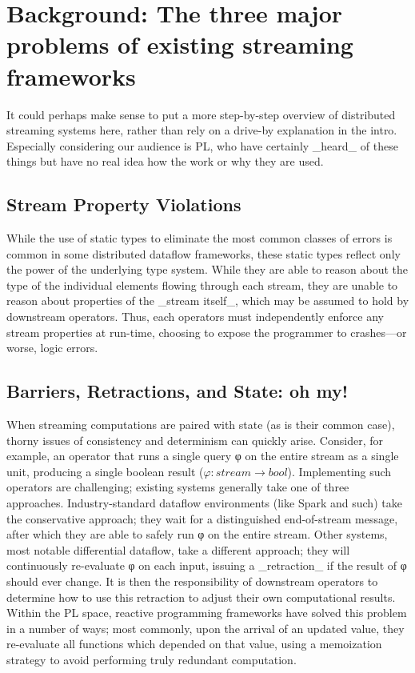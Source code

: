 \section{Background: The three major problems of existing streaming frameworks}

It could perhaps make sense to put a more step-by-step overview of distributed streaming systems here, rather than rely on a drive-by explanation in the intro. Especially considering our audience is PL, who have certainly _heard_ of these things but have no real idea how the work or why they are used. 

\subsection{Stream Property Violations}

While the use of static types to eliminate the most common classes of errors is common in some distributed dataflow frameworks, these static types reflect only the power of the underlying type system. While they are able to reason about the type of the individual elements flowing through each stream, they are unable to reason about properties of the _stream itself_, which may be assumed to hold by downstream operators. Thus, each operators must independently enforce any stream properties at run-time, choosing to expose the programmer to crashes---or worse, logic errors.

\subsection{Barriers, Retractions, and State: oh my!}

When streaming computations are paired with state (as is their common case), thorny issues of consistency and determinism can quickly arise.  Consider, for example, an operator that runs a single query φ on the entire stream as a single unit, producing a single boolean result ($φ : stream → bool$). Implementing such operators are challenging; existing systems generally take one of three approaches.  Industry-standard dataflow environments (like Spark and such) take the conservative approach; they wait for a distinguished end-of-stream message, after which they are able to safely run φ on the entire stream.  Other systems, most notable differential dataflow, take a different approach; they will continuously re-evaluate φ on each input, issuing a _retraction_ if the result of φ should ever change.  It is then the responsibility of downstream operators to determine how to use this retraction to adjust their own computational results.  Within the PL space, reactive programming frameworks have solved this problem in a number of ways; most commonly, upon the arrival of an updated value, they re-evaluate all functions which depended on that value, using a memoization strategy to avoid performing truly redundant computation.

